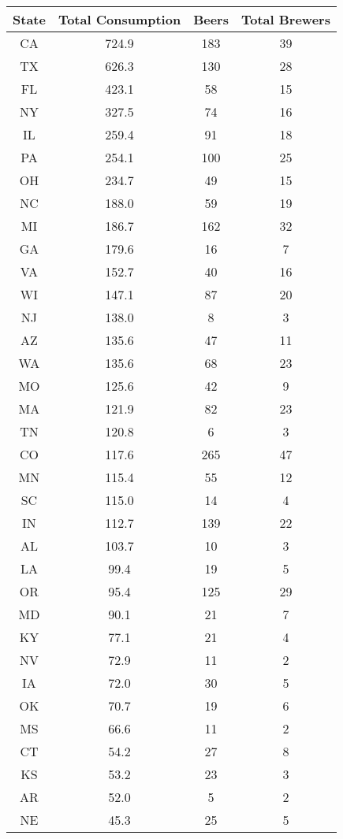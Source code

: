 \documentclass[]{article}
\begin{document}
\begin{table}[H]
\centering
\begin{tabular}{c|c|c|c}
\hline
State & Total Consumption & Beers & Total Brewers\\
\hline
CA & 724.9 & 183 & 39\\
\hline
TX & 626.3 & 130 & 28\\
\hline
FL & 423.1 & 58 & 15\\
\hline
NY & 327.5 & 74 & 16\\
\hline
IL & 259.4 & 91 & 18\\
\hline
PA & 254.1 & 100 & 25\\
\hline
OH & 234.7 & 49 & 15\\
\hline
NC & 188.0 & 59 & 19\\
\hline
MI & 186.7 & 162 & 32\\
\hline
GA & 179.6 & 16 & 7\\
\hline
VA & 152.7 & 40 & 16\\
\hline
WI & 147.1 & 87 & 20\\
\hline
NJ & 138.0 & 8 & 3\\
\hline
AZ & 135.6 & 47 & 11\\
\hline
WA & 135.6 & 68 & 23\\
\hline
MO & 125.6 & 42 & 9\\
\hline
MA & 121.9 & 82 & 23\\
\hline
TN & 120.8 & 6 & 3\\
\hline
CO & 117.6 & 265 & 47\\
\hline
MN & 115.4 & 55 & 12\\
\hline
SC & 115.0 & 14 & 4\\
\hline
IN & 112.7 & 139 & 22\\
\hline
AL & 103.7 & 10 & 3\\
\hline
LA & 99.4 & 19 & 5\\
\hline
OR & 95.4 & 125 & 29\\
\hline
MD & 90.1 & 21 & 7\\
\hline
KY & 77.1 & 21 & 4\\
\hline
NV & 72.9 & 11 & 2\\
\hline
IA & 72.0 & 30 & 5\\
\hline
OK & 70.7 & 19 & 6\\
\hline
MS & 66.6 & 11 & 2\\
\hline
CT & 54.2 & 27 & 8\\
\hline
KS & 53.2 & 23 & 3\\
\hline
AR & 52.0 & 5 & 2\\
\hline
NE & 45.3 & 25 & 5\\

\end{tabular}
\end{table}
\end{document}
